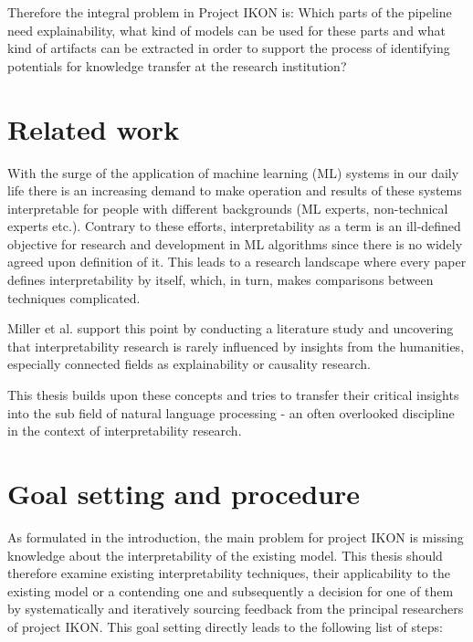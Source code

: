 \documentclass[pdftex,a4paper,12pt]{scrartcl}
\begin{document}
Therefore the integral problem in Project IKON is: Which parts of the pipeline need explainability, what kind of models can be used for these parts and what kind of artifacts can be extracted in order to support the process of identifying potentials for knowledge transfer at the research institution?

\section{Related work}

With the surge of the application of machine learning (ML) systems in our daily life there is an increasing demand to make operation and results of these systems interpretable for people with different backgrounds (ML experts, non-technical experts etc.). Contrary to these efforts, interpretability as a term is an ill-defined objective \cite{liptonMythosModelInterpretability2016}  for research and development in ML algorithms since there is no widely agreed upon definition of it. This leads to a research landscape where every paper defines interpretability by itself, which, in turn, makes comparisons between techniques complicated. 

Miller et al. \cite{millerExplainableAIBeware2017} support this point by conducting a literature study and uncovering that interpretability research is rarely influenced by insights from the humanities, especially connected fields as explainability or causality research.

This thesis builds upon these concepts  and tries to transfer their critical insights into the sub field of natural language processing - an often overlooked discipline in the context of interpretability research.

\section{Goal setting and procedure} 
As formulated in the introduction, the main problem for project IKON is missing knowledge about the interpretability of the existing model. This thesis should therefore examine existing interpretability techniques, their applicability to the existing model or a contending one and subsequently a decision for one of them by systematically and iteratively sourcing feedback from the principal researchers of project IKON. This goal setting directly leads to the following list of steps:
\end{document}
